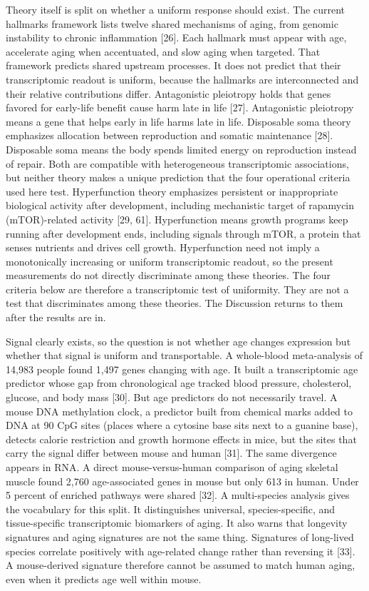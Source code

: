 \documentclass[11pt]{article}
\begin{document}
Theory itself is split on whether a uniform response should exist. The current hallmarks framework lists twelve shared mechanisms of aging, from genomic instability to chronic inflammation [26]. Each hallmark must appear with age, accelerate aging when accentuated, and slow aging when targeted. That framework predicts shared upstream processes. It does not predict that their transcriptomic readout is uniform, because the hallmarks are interconnected and their relative contributions differ. Antagonistic pleiotropy holds that genes favored for early-life benefit cause harm late in life [27]. Antagonistic pleiotropy means a gene that helps early in life harms late in life. Disposable soma theory emphasizes allocation between reproduction and somatic maintenance [28]. Disposable soma means the body spends limited energy on reproduction instead of repair. Both are compatible with heterogeneous transcriptomic associations, but neither theory makes a unique prediction that the four operational criteria used here test. Hyperfunction theory emphasizes persistent or inappropriate biological activity after development, including mechanistic target of rapamycin (mTOR)-related activity [29, 61]. Hyperfunction means growth programs keep running after development ends, including signals through mTOR, a protein that senses nutrients and drives cell growth. Hyperfunction need not imply a monotonically increasing or uniform transcriptomic readout, so the present measurements do not directly discriminate among these theories. The four criteria below are therefore a transcriptomic test of uniformity. They are not a test that discriminates among these theories. The Discussion returns to them after the results are in.

Signal clearly exists, so the question is not whether age changes expression but whether that signal is uniform and transportable. A whole-blood meta-analysis of 14,983 people found 1,497 genes changing with age. It built a transcriptomic age predictor whose gap from chronological age tracked blood pressure, cholesterol, glucose, and body mass [30]. But age predictors do not necessarily travel. A mouse DNA methylation clock, a predictor built from chemical marks added to DNA at 90 CpG sites (places where a cytosine base sits next to a guanine base), detects calorie restriction and growth hormone effects in mice, but the sites that carry the signal differ between mouse and human [31]. The same divergence appears in RNA. A direct mouse-versus-human comparison of aging skeletal muscle found 2,760 age-associated genes in mouse but only 613 in human. Under 5 percent of enriched pathways were shared [32]. A multi-species analysis gives the vocabulary for this split. It distinguishes universal, species-specific, and tissue-specific transcriptomic biomarkers of aging. It also warns that longevity signatures and aging signatures are not the same thing. Signatures of long-lived species correlate positively with age-related change rather than reversing it [33]. A mouse-derived signature therefore cannot be assumed to match human aging, even when it predicts age well within mouse.
\end{document}
